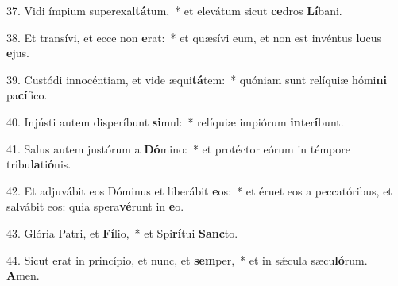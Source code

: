 37. Vidi ímpium superexal\textbf{tá}tum,~*  et elevátum sicut \textbf{ce}dros \textbf{Lí}bani.\

38. Et transívi, et ecce non \textbf{e}rat:~*  et quæsívi eum, et non est invéntus \textbf{lo}cus \textbf{e}jus.\

39. Custódi innocéntiam, et vide æqui\textbf{tá}tem:~*  quóniam sunt relíquiæ hómi\textbf{ni} pa\textbf{cí}fico.\

40. Injústi autem disperíbunt \textbf{si}mul:~*  relíquiæ impiórum \textbf{in}ter\textbf{í}bunt.\

41. Salus autem justórum a \textbf{Dó}mino:~*  et protéctor eórum in témpore tribu\textbf{la}ti\textbf{ó}nis.\

42. Et adjuvábit eos Dóminus et liberábit \textbf{e}os:~*  et éruet eos a peccatóribus, et salvábit eos: quia spera\textbf{vé}runt in \textbf{e}o.\

43. Glória Patri, et \textbf{Fí}lio,~*  et Spi\textbf{rí}tui \textbf{Sanc}to.\

44. Sicut erat in princípio, et nunc, et \textbf{sem}per,~*  et in sǽcula sæcu\textbf{ló}rum. \textbf{A}men.\

